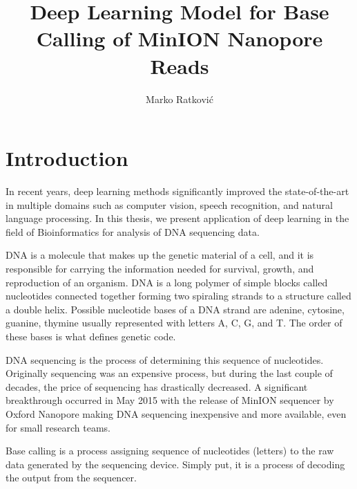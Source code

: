 \documentclass[times, utf8, diplomski, numeric, english]{fer}
\begin{document}
\title{Deep Learning Model for Base Calling of MinION Nanopore Reads}
\author{Marko Ratković}

\maketitle

\izvornik


\tableofcontents
\listoffigures
\listoftables

\chapter{Introduction}

In recent years,  deep learning methods significantly improved the state-of-the-art in multiple domains such as computer vision, speech recognition, and natural language processing\cite{LeCun:1998:CNI:303568.303704}\cite{NIPS2012_4824}. 
In this thesis, we present application of deep learning in the field of  Bioinformatics for analysis of DNA sequencing data. 

DNA is a molecule that makes up the genetic material of a cell, and it is responsible for carrying the information needed for survival, growth, and reproduction of an organism. 
DNA is a long polymer of simple blocks called nucleotides connected together forming two spiraling strands to a structure called a double helix.  Possible nucleotide bases of a DNA strand are adenine, cytosine, guanine, thymine usually represented with letters A, C, G, and T. The order of these bases is what defines genetic code.

DNA sequencing is the process of determining this sequence of nucleotides. Originally sequencing was an expensive process, but during the last couple of decades, the price of sequencing has drastically decreased.  A significant breakthrough occurred in May 2015 with the release of MinION sequencer by Oxford Nanopore making DNA sequencing inexpensive and more available, even for small research teams. 

Base calling is a process assigning sequence of nucleotides (letters) to the raw data generated by the sequencing device. Simply put, it is a process of decoding the output from the sequencer.
\end{document}

